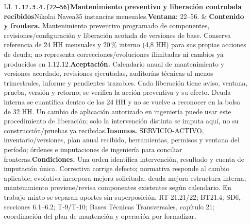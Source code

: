 \begin{longtable}{L{\tabcolsep\relax}L{\tabcolsep\relax}}
\texttt{1.\allowbreak{}12.\allowbreak{}3.\allowbreak{}4.\allowbreak{}\{22--56\}}\newline{}\textbf{Mantenimiento preventivo y liberación controlada recibidos}\newline{}Nikolai Navea\newline{}35 instancias mensuales.\newline{}\textbf{Ventana:} 22--56. & \textbf{Contenido y frontera.} Mantenimiento preventivo programado de componentes, revisiones/configuración y liberación acotada de versiones de base. Conserva referencia de 24 HH mensuales y 20\,\% interno (4,8 HH) para sus propias acciones de deuda; no representa correcciones/evoluciones ilimitadas ni cambios ya producidos en 1.12.12.\newline{}\textbf{Aceptación.} Calendario anual de mantenimiento y versiones acordado, revisiones ejecutadas, auditorías técnicas al menos trimestrales, informe y pendientes trazables. Cada liberación tiene aviso, ventana, prueba, versión y retorno; se verifica la acción preventiva y su efecto. Deuda interna se cuantifica dentro de las 24 HH y no se vuelve a reconocer en la bolsa de 32 HH. Un cambio de aplicación autorizado en ingeniería puede usar este procedimiento de liberación; solo la intervención distinta se imputa aquí, no su construcción/pruebas ya recibidas.\newline{}\textbf{Insumos.} SERVICIO-ACTIVO, inventario/versiones, plan anual recibido, herramientas, permisos y ventana del período; órdenes e imputaciones de ingeniería para conciliar fronteras.\newline{}\textbf{Condiciones.} Una orden identifica intervención, resultado y cuenta de imputación única. Correctiva corrige defecto; normativa responde al cambio aplicable; evolutiva incorpora mejora solicitada; deuda mejora estructura interna; mantenimiento previene/revisa componentes existentes según calendario. En trabajo mixto se separan aportes sin superposición. RT-21.21/22; BT21.4; SD6, secciones 6.1--6.2; T-9/T-10; Bases Técnicas Transversales, capítulo 21; coordinación del plan de mantención y operación por formalizar.\\\hline

\end{longtable}
